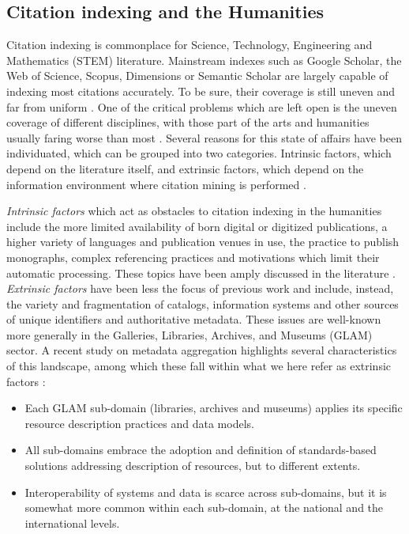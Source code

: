 \subsection{Citation indexing and the Humanities}\label{sec:citation-indexing}

Citation indexing is commonplace for Science, Technology, Engineering and Mathematics (STEM) literature. Mainstream indexes such as Google Scholar, the Web of Science, Scopus, Dimensions or Semantic Scholar are largely capable of indexing most citations accurately. To be sure, their coverage is still uneven and far from uniform \cite{martin-martin_google_2021, visser_large-scale_2021}. One of the critical problems which are left open is the uneven coverage of different disciplines, with those part of the arts and humanities usually faring worse than most \cite{harzing_google_2016}. Several reasons for this state of affairs have been individuated, which can be grouped into two categories. Intrinsic factors, which depend on the literature itself, and extrinsic factors, which depend on the information environment where citation mining is performed \cite{colavizza_citation_2019-1}. 

\textit{Intrinsic factors} which act as obstacles to citation indexing in the humanities include the more limited availability of born digital or digitized publications, a higher variety of languages and publication venues in use, the practice to publish monographs, complex referencing practices and motivations which limit their automatic processing. These topics have been amply discussed in the literature \cite{kulczycki_publication_2018, hicks_difficulty_1999, nederhof_bibliometric_2006, huang_characteristics_2008, santos_citing_2021}. \textit{Extrinsic factors} have been less the focus of previous work and include, instead, the variety and fragmentation of catalogs, information systems and other sources of unique identifiers and authoritative metadata. These issues are well-known more generally in the Galleries, Libraries, Archives, and Museums (GLAM) sector. A recent study on metadata aggregation highlights several characteristics of this landscape, among which these fall within what we here refer as extrinsic factors \cite{freire_cultural_2020}:
\begin{itemize}
\item Each GLAM sub-domain (libraries, archives and museums) applies its specific resource description practices and data models.
\item All sub-domains embrace the adoption and definition of standards-based solutions addressing description of resources, but to different extents.
\item Interoperability of systems and data is scarce across sub-domains, but it is somewhat more common within each sub-domain, at the national and the international levels.
\end{itemize}


